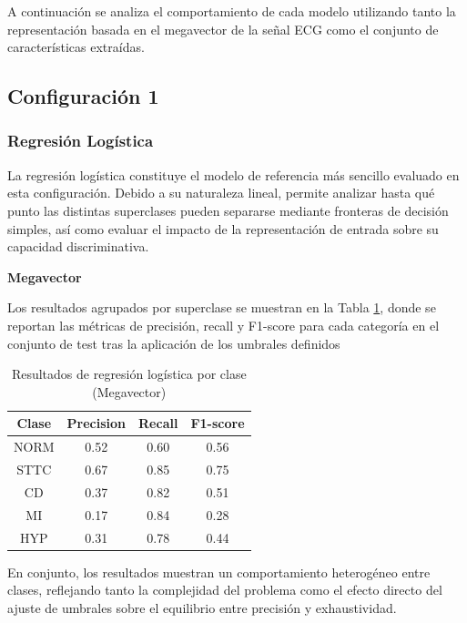 \documentclass[12pt,a4paper,twoside]{book}
\begin{document}
A continuación se analiza el comportamiento de cada modelo utilizando tanto la representación basada en el megavector de la señal ECG como el conjunto de características extraídas.

\subsection{Configuración 1}

\subsubsection*{Regresión Logística}

La regresión logística constituye el modelo de referencia más sencillo evaluado en esta configuración. 
Debido a su naturaleza lineal, permite analizar hasta qué punto las distintas superclases pueden separarse mediante fronteras de decisión simples, así como evaluar el impacto de la representación de entrada sobre su capacidad discriminativa.

\vspace{0.5cm}

\textbf{Megavector}

Los resultados agrupados por superclase se muestran en la Tabla \ref{tab:metrics_clase_lr_mv}, donde se reportan las métricas de precisión, recall y F1-score para cada categoría en el conjunto de test tras la aplicación de los umbrales definidos

\begin{table}[H]
	\centering
	\begin{tabular}{|c|c|c|c|}
	\hline
	\textbf{Clase} & \textbf{Precision} & \textbf{Recall} & \textbf{F1-score} \\
	\hline
	NORM & 0.52 & 0.60 & 0.56 \\
	STTC & 0.67 & 0.85 & 0.75 \\
	CD   & 0.37 & 0.82 & 0.51 \\
	MI   & 0.17 & 0.84 & 0.28 \\
	HYP  & 0.31 & 0.78 & 0.44 \\
	\hline
	\end{tabular}
	\caption{Resultados de regresión logística por clase (Megavector)}
	\label{tab:metrics_clase_lr_mv}
\end{table}

En conjunto, los resultados muestran un comportamiento heterogéneo entre clases, reflejando tanto la complejidad del problema como el efecto directo del ajuste de umbrales sobre el equilibrio entre precisión y exhaustividad.
\end{document}
